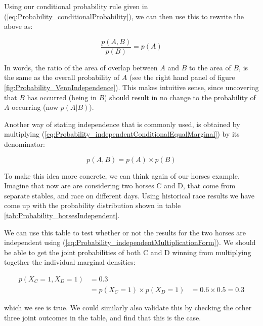 \documentclass[11pt,fullpage]{book}
\begin{document}
Using our conditional probability rule given in (\ref{eq:Probability_conditionalProbability}), we can then use this to rewrite the above as:

\begin{equation}\label{eq:Probability_independentConditionalEqualMarginal1}
\frac{p(A,B)}{p(B)} = p(A)
\end{equation}

In words, the ratio of the area of overlap between $A$ and $B$ to the area of $B$, is the same as the overall probability of $A$ (see the right hand panel of figure \ref{fig:Probability_VennIndependence}). This makes intuitive sense, since uncovering that $B$ has occurred (being in $B$) should result in no change to the probability of $A$ occurring (now $p(A|B)$).

Another way of stating independence that is commonly used, is obtained by multiplying (\ref{eq:Probability_independentConditionalEqualMarginal}) by its denominator:

\begin{equation}\label{eq:Probability_independentMultiplicationForm}
p(A,B) = p(A)\times p(B)
\end{equation}

To make this idea more concrete, we can think again of our horses example. Imagine that now are are considering two horses C and D, that come from separate stables, and race on different days. Using historical race results we have come up with the probability distribution shown in table \ref{tab:Probability_horsesIndependent}. 

We can use this table to test whether or not the results for the two horses are independent using (\ref{eq:Probability_independentMultiplicationForm}). We should be able to get the joint probabilities of both C and D winning from multiplying together the individual marginal densities:

\begin{align}
p(X_C=1,X_D=1) &= 0.3\\
&= p(X_C=1) \times p(X_D=1) 
&= 0.6 \times 0.5 = 0.3
\end{align}

which we see is true. We could similarly also validate this by checking the other three joint outcomes in the table, and find that this is the case.
\end{document}
